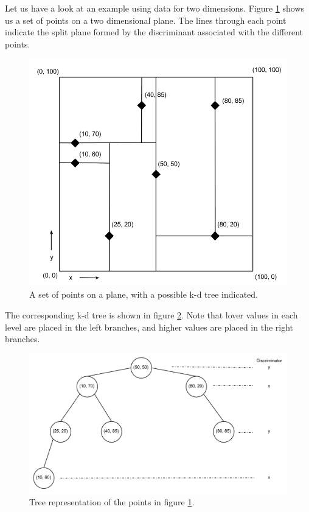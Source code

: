 Let us have a look at an example using data for two dimensions. Figure \ref{fig:kd_tree_2d_plane} shows us a set of points on a two dimensional plane. The lines through each point indicate the split plane formed by the discriminant associated with the different points.

\begin{figure}[ht!]
\centering
\includegraphics[width=120mm]{../gfx/kd_tree_illustration_graph.png}
\caption{A set of points on a plane, with a possible k-d tree indicated.}
\label{fig:kd_tree_2d_plane}
\end{figure}

The corresponding k-d tree is shown in figure \ref{fig:kd_tree_2d}. Note that lover values in each level are placed in the left branches, and higher values are placed in the right branches.

\begin{figure}[ht!]
\centering
\includegraphics[width=120mm]{../gfx/kd_tree_illustration_tree.png}
\caption{Tree representation of the points in figure \ref{fig:kd_tree_2d_plane}.}
\label{fig:kd_tree_2d}
\end{figure}

